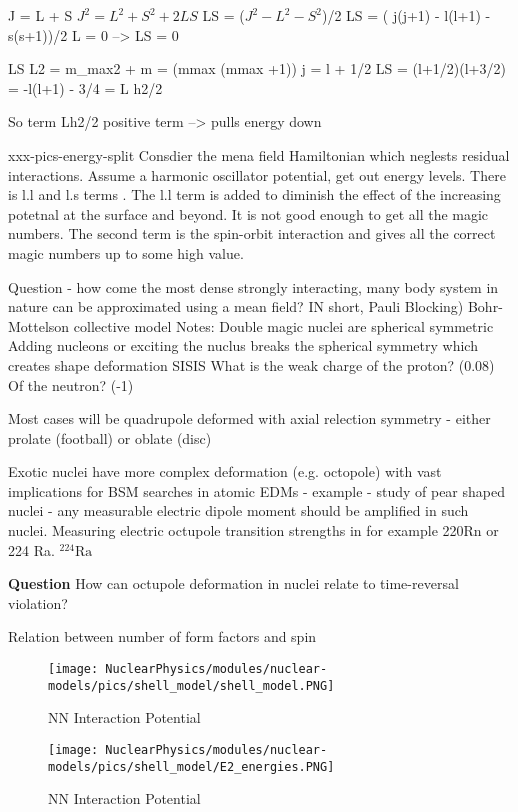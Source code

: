 J = L + S
$J^2 = L^2 + S^2 + 2LS$
LS = ($J^2 -L^2 -S^2$)/2
LS = ( j(j+1) - l(l+1) - s(s+1))/2
L = 0 --> LS = 0

LS
L2 = m_max2 + m = (mmax (mmax +1))
j = l + 1/2
LS = (l+1/2)(l+3/2) = -l(l+1) - 3/4 = L h2/2

So term Lh2/2 positive term --> pulls energy down

xxx-pics-energy-split
        \indent Consdier the mena field Hamiltonian which neglests residual interactions. Assume a harmonic oscillator potential, get out energy levels. There is l.l and l.s terms . The l.l term is added to diminish the effect of the increasing potetnal at the surface and beyond. It is not good enough to get all the magic numbers. The second term is the spin-orbit interaction and gives all the correct magic numbers up to some high value. 
    
        Question - how come the most dense strongly interacting, many body system in nature can be approximated using a mean field? IN short, Pauli Blocking)
        Bohr-Mottelson collective model
        Notes:
        Double magic nuclei are spherical symmetric
        Adding nucleons or exciting the nuclus breaks the spherical symmetry which creates shape deformation
        SISIS
        What is the weak charge of the proton? (0.08) Of the neutron? (-1)
        
        Most cases will be quadrupole deformed with axial relection symmetry - either prolate (football) or oblate (disc)
        
        Exotic nuclei have more complex deformation (e.g. octopole) with vast implications for BSM searches in atomic EDMs - example - study of pear shaped nuclei - any measurable electric dipole moment should be amplified in such nuclei. Measuring electric octupole transition strengths in for example 220Rn or 224 Ra. $^{224}\!\text{Ra}$
        
        \textbf{Question} How can octupole deformation in nuclei relate to time-reversal violation?
        
        Relation between number of form factors and spin

        \begin{figure}[H]
            \centering
            \texttt{[image: NuclearPhysics/modules/nuclear-models/pics/shell\_model/shell\_model.PNG]}
        \caption{NN Interaction Potential}
        \end{figure}
        
        
        \begin{figure}[H]
            \centering
            \texttt{[image: NuclearPhysics/modules/nuclear-models/pics/shell\_model/E2\_energies.PNG]}
        \caption{NN Interaction Potential}
        \end{figure}
        
